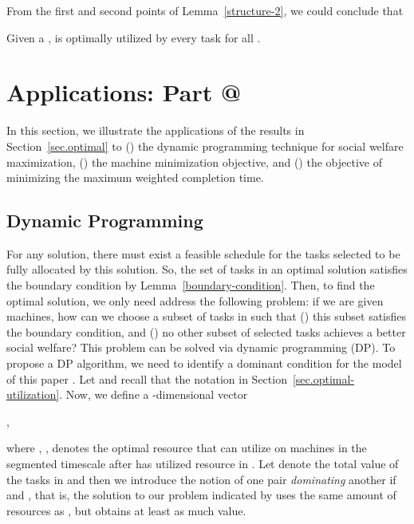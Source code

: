 \documentclass[10pt,journal,compsoc]{IEEEtran}
\makeatletter
\newcommand{\rmnum}[1]{\romannumeral #1}
\newcommand{\Rmnum}[1]{\expandafter\@slowromancap\romannumeral #1@}
\makeatother
\begin{document}
From the first and second points of Lemma~\ref{structure-2}, we could conclude that
\begin{proposition}\label{fully-2}
Given a ,  is optimally utilized by every task  for all .
\end{proposition}










\section{Applications: Part \Rmnum{2}}
\label{more-app-2}

In this section, we illustrate the applications of the results in Section~\ref{sec.optimal} to (\rmnum{1}) the dynamic programming technique for social welfare maximization, (\rmnum{2}) the machine minimization objective, and (\rmnum{3}) the objective of minimizing the maximum weighted completion time.


\subsection{Dynamic Programming}



For any solution, there must exist a feasible schedule for the tasks selected to be fully allocated by this solution. So, the set of tasks in an optimal solution satisfies the boundary condition by Lemma~\ref{boundary-condition}. Then, to find the optimal solution, we only need address the following problem: if we are given  machines, how can we choose a subset  of tasks in  such that (\rmnum{1}) this subset satisfies the boundary condition, and (\rmnum{2}) no other subset of selected tasks achieves a better social welfare? This problem can be solved via dynamic programming (DP). To propose a DP algorithm, we need to identify a dominant condition for the model of this paper \cite{Williamson}. Let  and recall that the notation  in Section~\ref{sec.optimal-utilization}. Now, we define a -dimensional vector
\begin{center}
,
\end{center}
where , , denotes the optimal resource that  can utilize on  machines in the segmented timescale  after  has utilized  resource in . Let  denote the total value of the tasks in  and then we introduce the notion of one pair  {\em dominating} another  if  and , that is, the solution to our problem indicated by  uses the same amount of resources as , but obtains at least as much value.
\end{document}
